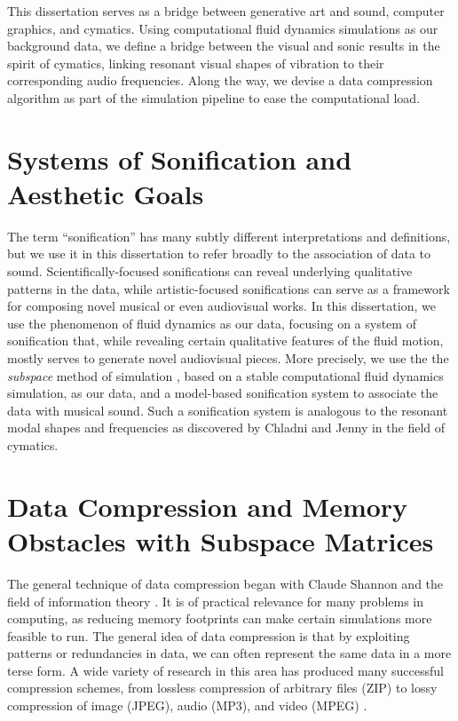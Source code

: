 This dissertation serves as a bridge between generative art and sound, computer graphics, and cymatics. Using computational fluid dynamics simulations as our background data, we define a bridge between the visual
and sonic results in the spirit of cymatics, linking resonant visual shapes of vibration to their corresponding audio frequencies. Along the way, we devise a data compression algorithm as part of the simulation pipeline to
ease the computational load. 

\section{Systems of Sonification and Aesthetic Goals}
The term ``sonification'' has many subtly different interpretations and definitions, but we use it in this dissertation to refer broadly to the association of data to sound. Scientifically-focused sonifications can reveal underlying
qualitative patterns in the data, while artistic-focused sonifications can serve as a framework for composing novel musical or even audiovisual works. In this dissertation, we use the phenomenon of fluid dynamics as our
data, focusing on a system of sonification that, while revealing certain qualitative features of the fluid motion, mostly serves to generate novel audiovisual pieces. More precisely, we use the the {\em subspace} method of simulation \cite{Treuille:2006:MRF}, based on a stable computational fluid dynamics simulation, as our data, and a model-based sonification system to associate the data with musical sound. Such a sonification system is analogous to the resonant modal shapes and 
frequencies as discovered by Chladni and Jenny in the field of cymatics.

\section{Data Compression and Memory Obstacles with Subspace Matrices}
The general technique of data compression began with Claude Shannon \cite{shannon1998mathematical} and the field of information theory \cite{cover2012elements}. It is of practical relevance for many problems in computing, as reducing memory footprints
can make certain simulations more feasible to run. The general idea of data compression is that by exploiting patterns or redundancies in data, we can often represent the same data in a more terse form.
A wide variety of research in this area has produced many successful compression schemes, from lossless compression of arbitrary files (ZIP) to lossy compression of image (JPEG), audio (MP3), and video (MPEG) \cite{ziv1977universal, wallace1992jpeg, iso1993iec, le1991mpeg}.

